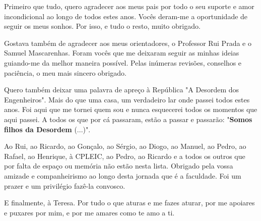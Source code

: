 
\noindent Primeiro que tudo, quero agradecer aos meus pais por todo o seu suporte e amor incondicional ao longo de todos estes anos.
Vocês deram-me a oportunidade de seguir os meus sonhos.
Por isso, e tudo o resto, muito obrigado.

Gostava também de agradecer aos meus orientadores, o Professor Rui Prada e o Samuel Mascarenhas.
Foram vocês que me deixaram seguir as minhas ideias guiando-me da melhor maneira possível.
Pelas inúmeras revisões, conselhos e paciência, o meu mais sincero obrigado.

Quero também deixar uma palavra de apreço à República "A Desordem dos Engenheiros".
Mais do que uma casa, um verdadeiro lar onde passei todos estes anos.
Foi aqui que me tornei quem sou e nunca esquecerei todos os momentos que aqui passei.
A todos os que por cá passaram, estão a passar e passarão: "\textbf{Somos filhos da Desordem} (...)".

Ao Rui, ao Ricardo, ao Gonçalo, ao Sérgio, ao Diogo, ao Manuel, ao Pedro, ao Rafael, ao Henrique, à CPLEIC, ao Pedro, ao Ricardo e a todos os outros que por falta de espaço ou memória não estão nesta lista.
Obrigado pela vossa amizade e companheirismo ao longo desta jornada que é a faculdade.
Foi um prazer e um privilégio fazê-la convosco.

E finalmente, à Teresa.
Por tudo o que aturas e me fazes aturar, por me apoiares e puxares por mim, e por me amares como te amo a ti.